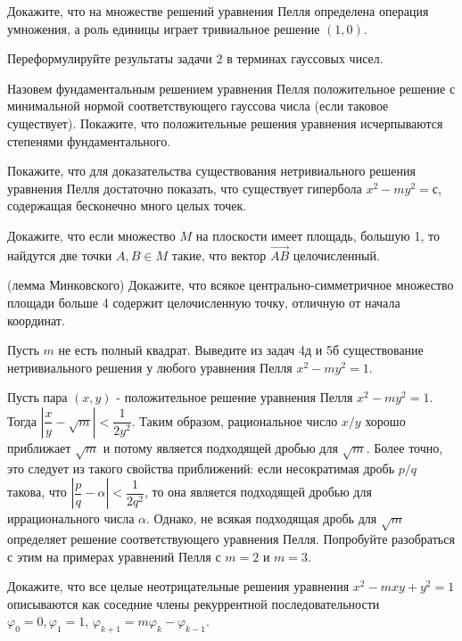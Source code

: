 \documentclass[a4paper,12pt]{article}
\begin{document}
 Докажите, что на множестве решений уравнения Пелля определена операция
умножения, а роль единицы играет тривиальное решение $(1,0)$.

 Переформулируйте результаты задачи 2 в терминах гауссовых чисел.

 Назовем фундаментальным решением уравнения Пелля
положительное решение с минимальной нормой соответствующего гауссова числа
(если таковое существует). Покажите, что положительные решения уравнения
исчерпываются степенями фундаментального.

 \label{1}
Покажите, что для доказательства существования нетривиального решения уравнения Пелля
 достаточно показать, что существует гипербола $x^2-my^2=с$, содержащая
 бесконечно много целых точек.

 Докажите, что если множество $M$ на плоскости имеет площадь, большую
1, то найдутся две точки $A,B\in M$ такие, что вектор $\overrightarrow{AB}$
целочисленный.

 \label{2}(лемма Минковского) Докажите, что всякое центрально-симметричное
 множество площади больше 4 содержит целочисленную точку, отличную от начала
 координат.

 Пусть $m$ не есть полный квадрат. Выведите из  задач 4д и 5б
существование нетривиального решения
у любого уравнения Пелля $x^2-my^2=1$.


 Пусть пара $(x,y)$ - положительное решение уравнения Пелля $x^2-my^2=1$.
Тогда $\left|\dfrac{x}{y}-\sqrt{m}\right|<\dfrac{1}{2y^2}$.
Таким образом, рациональное число $x/y$ хорошо приближает $\sqrt{m}$ и потому является
подходящей дробью для  $\sqrt{m}$. Более точно, это следует из такого
свойства приближений: если несократимая дробь $p/q$ такова, что
$\left|\dfrac{p}{q}-\alpha\right|<\dfrac{1}{2q^2}$, то она является подходящей дробью для
иррационального числа $\alpha$. Однако, не всякая подходящая дробь для $\sqrt{m}$
определяет решение соответствующего уравнения Пелля. Попробуйте разобраться с этим на примерах
уравнений Пелля с $m=2$ и $m=3$.

 Докажите, что все целые неотрицательные решения  уравнения $x^2-mxy+y^2=1$ описываются
как соседние члены рекуррентной последовательности $\varphi_0=0,\varphi_1=1$, $\varphi_{k+1}=
m\varphi_k-\varphi_{k-1}$.

\GenXMLW




\end{document}
